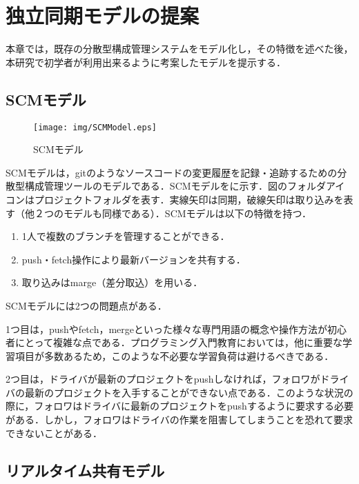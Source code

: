 \chapter{独立同期モデルの提案}\label{Model}

本章では，既存の分散型構成管理システムをモデル化し，その特徴を述べた後，本研究で初学者が利用出来るように考案したモデルを提示する．


\section{SCMモデル}

\begin{figure}[h]
	\centering
	\texttt{[image: img/SCMModel.eps]}
	\caption{SCMモデル}
	\label{fig:SCMModel}
\end{figure}

SCMモデルは，gitのようなソースコードの変更履歴を記録・追跡するための分散型構成管理ツールのモデルである．SCMモデルをに示す．図のフォルダアイコンはプロジェクトフォルダを表す．実線矢印は同期，破線矢印は取り込みを表す（他２つのモデルも同様である）．SCMモデルは以下の特徴を持つ．

\begin{enumerate}
	\item 1人で複数のブランチを管理することができる．
	\item push・fetch操作により最新バージョンを共有する．
	\item 取り込みはmarge（差分取込）を用いる．
\end{enumerate}

SCMモデルには2つの問題点がある．

1つ目は，pushやfetch，mergeといった様々な専門用語の概念や操作方法が初心者にとって複雑な点である．プログラミング入門教育においては，他に重要な学習項目が多数あるため，このような不必要な学習負荷は避けるべきである．

2つ目は，ドライバが最新のプロジェクトをpushしなければ，フォロワがドライバの最新のプロジェクトを入手することができない点である．このような状況の際に，フォロワはドライバに最新のプロジェクトをpushするように要求する必要がある．しかし，フォロワはドライバの作業を阻害してしまうことを恐れて要求できないことがある．


\section{リアルタイム共有モデル}

